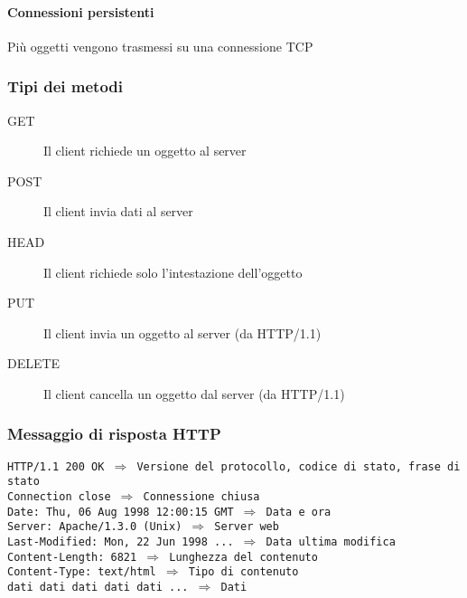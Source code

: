             \paragraph{Connessioni persistenti} Più oggetti vengono trasmessi su una connessione TCP
        \subsubsection{Tipi dei metodi}
            \begin{description}
                \item[GET] Il client richiede un oggetto al server 
                \item[POST] Il client invia dati al server
                \item[HEAD] Il client richiede solo l'intestazione dell'oggetto
                \item[PUT] Il client invia un oggetto al server (da HTTP/1.1)
                \item[DELETE] Il client cancella un oggetto dal server (da HTTP/1.1)
            \end{description}
        \subsubsection{Messaggio di risposta HTTP}
            \texttt{HTTP/1.1 200 OK $\Rightarrow$ Versione del protocollo, codice di stato, frase di stato\\
                Connection close $\Rightarrow$ Connessione chiusa\\
                Date: Thu, 06 Aug 1998 12:00:15 GMT $\Rightarrow$ Data e ora\\
                Server: Apache/1.3.0 (Unix) $\Rightarrow$ Server web\\
                Last-Modified: Mon, 22 Jun 1998 ... $\Rightarrow$ Data ultima modifica\\
                Content-Length: 6821 $\Rightarrow$ Lunghezza del contenuto\\
                Content-Type: text/html $\Rightarrow$ Tipo di contenuto\\
                dati dati dati dati dati  ... $\Rightarrow$ Dati
            }
